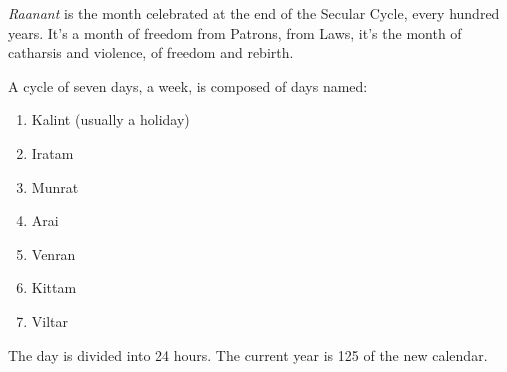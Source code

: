 \documentclass[landscape,10pt,a4paper]{article}
\begin{document}
\begin{multicols}{3}
\begin{dmbox}[title=The Calendar \pageref{il-calendario}]
	\medskip

\emph{Raanant} is the month celebrated at the end of the Secular Cycle, every hundred years. It's a month of freedom from Patrons, from Laws, it's the month of catharsis and violence, of freedom and rebirth.

\medskip

A cycle of seven days, a week, is composed of days named:

\medskip

\begin{enumerate}
\item Kalint (usually a holiday)
\item Iratam
\item Munrat
\item Arai
\item Venran
\item Kittam
\item Viltar
\end{enumerate}

\medskip

The day is divided into 24 hours. The current year is 125 of the new calendar.

\end{dmbox}


\end{multicols}


\pagebreak
\end{document}
